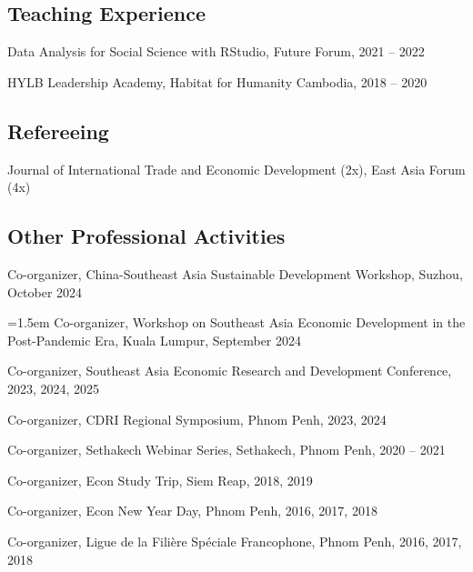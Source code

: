 \documentclass[10pt,a4paper]{article}
\begin{document}
\subsection*{Teaching Experience}

Data Analysis for Social Science with RStudio, Future Forum, 2021 -- 2022

HYLB Leadership Academy, Habitat for Humanity Cambodia, 2018 -- 2020

\subsection*{Refereeing}

Journal of International Trade and Economic Development (2x), East Asia Forum (4x)


\subsection*{Other Professional Activities}

Co-organizer, China-Southeast Asia Sustainable Development Workshop, Suzhou, October 2024

\hangindent=1.5em
Co-organizer, Workshop on Southeast Asia Economic Development in the Post-Pandemic Era, Kuala Lumpur, September 2024

Co-organizer, Southeast Asia Economic Research and Development Conference, 2023, 2024, 2025

Co-organizer, CDRI Regional Symposium, Phnom Penh, 2023, 2024

Co-organizer, Sethakech Webinar Series, Sethakech, Phnom Penh, 2020 -- 2021

Co-organizer, Econ Study Trip, Siem Reap, 2018, 2019

Co-organizer, Econ New Year Day, Phnom Penh, 2016, 2017, 2018

Co-organizer, Ligue de la Filière Spéciale Francophone, Phnom Penh, 2016, 2017, 2018
\end{document}
